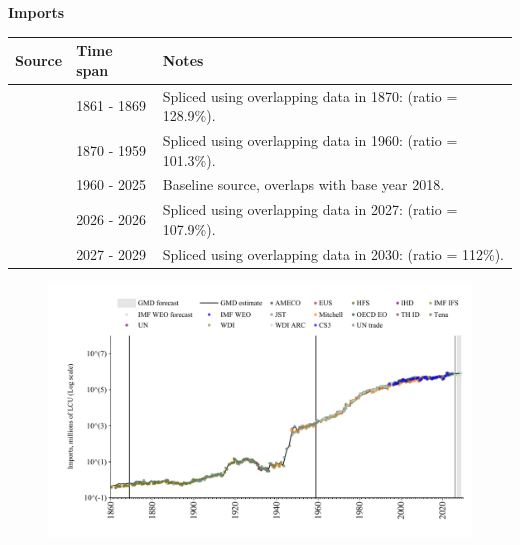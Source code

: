 \documentclass[12pt,a4paper,landscape]{article}
\begin{document}
\begin{adjustbox}{max totalsize={\paperwidth}{\paperheight},center}
\begin{minipage}[t][\textheight][t]{\textwidth}
\vspace*{0.5cm}
{}
\begin{center}
{\Large\bfseries Imports}
\end{center}
\vspace{0.5cm}
\begin{table}[H]
\centering
\small
\begin{tabular}{|l|l|l|}
\hline
\textbf{Source} & \textbf{Time span} & \textbf{Notes} \\
\hline
\rowcolor{white}\cite{Tena}& 1861 - 1869 &Spliced using overlapping data in 1870: (ratio = 128.9\%). \\
\rowcolor{lightgray}\cite{JST}& 1870 - 1959 &Spliced using overlapping data in 1960: (ratio = 101.3\%). \\
\rowcolor{white}\cite{OECD_EO}& 1960 - 2025 &Baseline source, overlaps with base year 2018. \\
\rowcolor{lightgray}\cite{AMECO}& 2026 - 2026 &Spliced using overlapping data in 2027: (ratio = 107.9\%). \\
\rowcolor{white}\cite{IMF_WEO_forecast}& 2027 - 2029 &Spliced using overlapping data in 2030: (ratio = 112\%). \\
\hline
\end{tabular}
\end{table}
\begin{figure}[H]
\centering
\includegraphics[width=\textwidth,height=0.6\textheight,keepaspectratio]{graphs/ITA_imports.pdf}
\end{figure}
\end{minipage}
\end{adjustbox}
\end{document}
